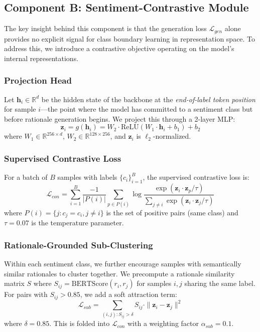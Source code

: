 \documentclass[conference]{IEEEtran}
\begin{document}
\subsection{Component B: Sentiment-Contrastive Module}

The key insight behind this component is that the generation loss $\mathcal{L}_{gen}$ alone provides no explicit signal for class boundary learning in representation space. To address this, we introduce a contrastive objective operating on the model's internal representations.

\subsubsection{Projection Head}

Let $\mathbf{h}_i \in \mathbb{R}^d$ be the hidden state of the backbone at the \emph{end-of-label token position} for sample $i$---the point where the model has committed to a sentiment class but before rationale generation begins. We project this through a 2-layer MLP:
\begin{equation}
    \mathbf{z}_i = g(\mathbf{h}_i) = W_2 \cdot \text{ReLU}(W_1 \cdot \mathbf{h}_i + b_1) + b_2
\end{equation}
where $W_1 \in \mathbb{R}^{256 \times d}$, $W_2 \in \mathbb{R}^{128 \times 256}$, and $\mathbf{z}_i$ is $\ell_2$-normalized.

\subsubsection{Supervised Contrastive Loss}

For a batch of $B$ samples with labels $\{c_i\}_{i=1}^B$, the supervised contrastive loss is:
\begin{equation}
    \mathcal{L}_{con} = \sum_{i=1}^{B} \frac{-1}{|P(i)|} \sum_{p \in P(i)} \log \frac{\exp(\mathbf{z}_i \cdot \mathbf{z}_p / \tau)}{\sum_{j \neq i} \exp(\mathbf{z}_i \cdot \mathbf{z}_j / \tau)}
\end{equation}
where $P(i) = \{j : c_j = c_i, j \neq i\}$ is the set of positive pairs (same class) and $\tau = 0.07$ is the temperature parameter.

\subsubsection{Rationale-Grounded Sub-Clustering}

Within each sentiment class, we further encourage samples with semantically similar rationales to cluster together. We precompute a rationale similarity matrix $S$ where $S_{ij} = \text{BERTScore}(r_i, r_j)$ for samples $i, j$ sharing the same label. For pairs with $S_{ij} > 0.85$, we add a soft attraction term:
\begin{equation}
    \mathcal{L}_{sub} = \sum_{(i,j): S_{ij} > \delta} S_{ij} \cdot \| \mathbf{z}_i - \mathbf{z}_j \|^2
\end{equation}
where $\delta = 0.85$. This is folded into $\mathcal{L}_{con}$ with a weighting factor $\alpha_{sub} = 0.1$.
\end{document}
